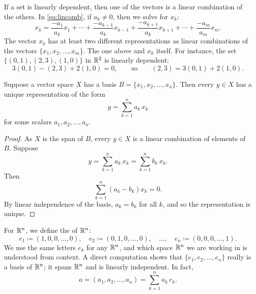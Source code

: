 If a set is linearly dependent, then one of the
vectors is a linear combination of the others.
In \eqref{eq:lincomb},
if $a_k \neq 0$, then we solve for $x_k$:
\begin{equation*}
x_k = \frac{-a_1}{a_k} x_1 + \cdots + 
\frac{-a_{k-1}}{a_k} x_{k-1} +
\frac{-a_{k+1}}{a_k} x_{k+1} +
\cdots + 
\frac{-a_m}{a_m} x_m .
\end{equation*}
The vector $x_k$ has at least two different representations
as linear combinations of the vectors $\{ x_1,x_2,\ldots,x_m \}$. The one above and
$x_k$ itself. 
For instance, the set $\bigl\{ (0,1), (2,3), (1,0) \bigr\}$ in ${\mathbb{R}}^2$ is linearly dependent:
\begin{equation*}
3(0,1) - (2,3) + 2(1,0) = 0 ,
\qquad \text{so} \qquad
(2,3) = 3(0,1) + 2(1,0) .
\end{equation*}

\begin{prop}
Suppose a vector space $X$ has a basis 
$B = \{ x_1, x_2, \ldots, x_n \}$.  Then
every $y \in X$ has a unique representation of the form
\begin{equation*}
y = \sum_{k=1}^n a_k \, x_k
\end{equation*}
for some scalars $a_1, a_2, \ldots, a_n$.
\end{prop}

\begin{proof}
As $X$ is the span of $B$,
every $y \in X$ is a linear combination of elements of $B$.
Suppose
\begin{equation*}
y = \sum_{k=1}^n a_k \, x_k = \sum_{k=1}^n b_k \, x_k .
\end{equation*}
Then
\begin{equation*}
\sum_{k=1}^n (a_k-b_k) x_k = 0 .
\end{equation*}
By linear independence of the basis, $a_k = b_k$ for all $k$, and so
the representation is unique.
\end{proof}

For ${\mathbb{R}}^n$,
we define
the \emph{} of ${\mathbb{R}}^n$:
\begin{equation*}
e_1 \coloneqq (1,0,0,\ldots,0) , \quad
e_2 \coloneqq (0,1,0,\ldots,0) , \quad \ldots, \quad
e_n \coloneqq (0,0,0,\ldots,1) .
\end{equation*}
We use the same letters $e_k$ for any ${\mathbb{R}}^n$, and
which space ${\mathbb{R}}^n$ we are working in is understood from context.
A direct computation shows that $\{ e_1, e_2, \ldots, e_n \}$ really is
a basis of ${\mathbb{R}}^n$; it spans ${\mathbb{R}}^n$ and is
linearly independent.  In fact,
\begin{equation*}
a = (a_1,a_2,\ldots,a_n) = \sum_{k=1}^n a_k \, e_k .
\end{equation*}

